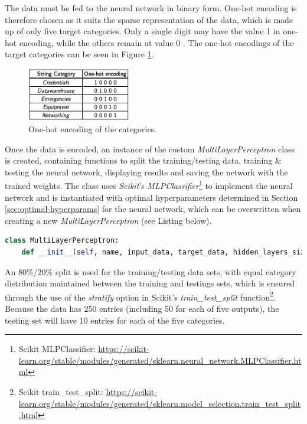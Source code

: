 \documentclass[letterpaper,12pt]{article}
\begin{document}
The data must be fed to the neural network in binary form. One-hot encoding is therefore chosen as it suits the sparse representation of the data, which is made up of only five target categories. Only a single digit may have the value 1 in one-hot encoding, while the others remain at value 0 \cite{lec16}. The one-hot encodings of the target categories can be seen in Figure \ref{fig:one_hot_encoding}.

\begin{figure}[h] 
\centerline{\includegraphics[width=0.4\textwidth]{report/figures/one_hot_encoding.png}}
\caption{\label{fig:one_hot_encoding}One-hot encoding of the categories.}
\end{figure}

Once the data is encoded, an instance of the custom \textit{MultiLayerPerceptron} class is created, containing functions to split the training/testing data, training \& testing the neural network, displaying results and saving the network with the trained weights. The class uses \textit{Scikit}'s \textit{MLPClassifier}\footnote{Scikit MLPClassifier: \url{https://scikit-learn.org/stable/modules/generated/sklearn.neural_network.MLPClassifier.html}} to implement the neural network and is instantiated with optimal hyperparameters determined in Section \ref{sec:optimal-hyperparams} for the neural network, which can be overwritten when creating a new \textit{MultiLayerPerceptron} (see Listing below).

\begin{lstlisting}[language=Python]
class MultiLayerPerceptron:
    def __init__(self, name, input_data, target_data, hidden_layers_size=(15,), solver="adam", activation_function="logistic", learning_rate_init=0.6, momentum=0.9, optimisation_tolerance=0.0001, num_iterations_no_change=1000, max_iterations=10000, verbose=config.debug):
\end{lstlisting}

An 80\%/20\% split is used for the training/testing data sets, with equal category distribution maintained between the training and testings sets, which is ensured through the use of the \textit{stratify} option in Scikit's \textit{train\_test\_split} function\footnote{Scikit train\_test\_split: \url{https://scikit-learn.org/stable/modules/generated/sklearn.model_selection.train_test_split.html}}. Because the data has 250 entries (including 50 for each of five outputs), the testing set will have 10 entries for each of the five categories.\\
\end{document}
